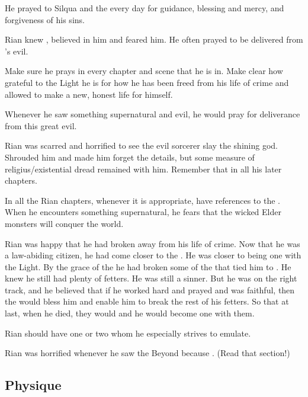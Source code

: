 He prayed to Silqua and the \sephiroth every day for guidance, blessing and mercy, and forgiveness of his sins. 

Rian knew \Isphet, believed in him and feared him. 
He often prayed to be delivered from \Isphet's evil. 
    
Make sure he prays in every chapter and scene that he is in.
Make clear how grateful to the Light he is for how he has been freed from his life of crime and allowed to make a new, honest life for himself.

Whenever he saw something supernatural and evil, he would pray for deliverance from this great evil.

Rian was scarred and horrified to see the evil sorcerer slay the shining god. 
\Criseis Shrouded him and made him forget the details, but some measure of religius/existential dread remained with him. 
Remember that in all his later chapters.

In all the Rian chapters, whenever it is appropriate, have references to the . 
When he encounters something supernatural, he fears that the wicked Elder monsters will conquer the world. 

Rian was happy that he had broken away from his life of crime. 
Now that he was a law-abiding citizen, he had come closer to the .
He was closer to being one with the Light. 
By the grace of the \sephiroth he had broken some of the  that tied him to \Itzach.
He knew he still had plenty of fetters. 
He was still a sinner.
But he was on the right track, and he believed that if he worked hard and prayed and was faithful, then the \sephiroth would bless him and enable him to break the rest of his fetters.
So that at last, when he died, they would  and he would become one with them.

Rian should have one or two \sephiroth whom he especially strives to emulate. 

Rian was horrified whenever he saw the Beyond because . 
(Read that section!)









\subsection{Physique}





